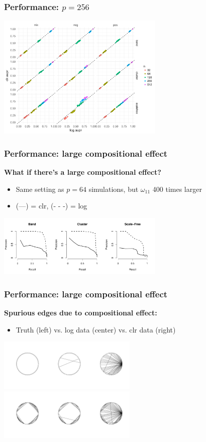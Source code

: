 \documentclass{beamer}
\begin{document}
\begin{frame}
\frametitle{Performance: $p = 256$}
\begin{center}
\includegraphics[width=300px]{figs/glasso-256.pdf}
\end{center}
\end{frame}

\begin{frame}
\frametitle{Performance: large compositional effect}
\textbf{What if there's a large compositional effect?}
\begin{itemize}
\item Same setting as $p=64$ simulations, but $\omega_{11}$ 400 times larger
\item (---) = clr, (- - -) = log
\end{itemize}
\begin{center}
\includegraphics[width=300px]{figs/var-dom-pr.pdf}
\end{center}
\end{frame}

\begin{frame}
\frametitle{Performance: large compositional effect}
\textbf{Spurious edges due to compositional effect:}
\begin{itemize}
\item Truth (left) vs. log data (center) vs. clr data (right)
\end{itemize}
\begin{center}
\includegraphics[width=250px]{figs/var-dom-band.pdf} \\
\includegraphics[width=250px]{figs/var-dom-cluster.pdf}
\end{center}
\end{frame}
\end{document}
